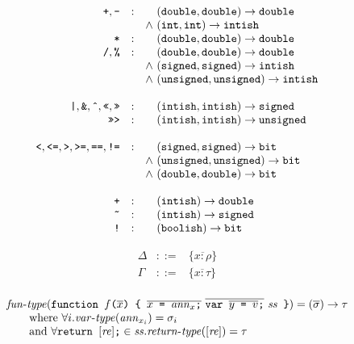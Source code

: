 \documentclass{article}
\newcommand{\funtype}{\mathit{fun}\mbox{-}\mathit{type}}
\newcommand{\vartype}{\mathit{var}\mbox{-}\mathit{type}}
\newcommand{\rettype}{\mathit{return}\mbox{-}\mathit{type}}
\newcommand{\funty}[2]{({#1}) \rightarrow {#2}}
\newcommand{\seq}[1]{\overline{{#1}}}
\newcommand{\mathjs}[1]{\mbox{\texttt{{#1}}}}
\newcommand{\return}[1]{\mathjs{return }{#1}\mathjs{;}}
\newcommand{\fun}[3]{\mathjs{function }{#1}\mathjs{(}{#2}\mathjs{) \char123{} }{#3}\mathjs{ \char125{}}}
\newcommand{\var}[1]{\mathjs{var }{#1}\mathjs{;}}
\newcommand{\bit}{\mathtt{bit}}
\newcommand{\unsigned}{\mathtt{unsigned}}
\newcommand{\signed}{\mathtt{signed}}
\newcommand{\double}{\mathtt{double}}
\renewcommand{\int}{\mathtt{int}}
\newcommand{\boolish}{\mathtt{boolish}}
\newcommand{\intish}{\mathtt{intish}}
\begin{document}
\[
\begin{array}{rcc@{\ }l}
\mathjs{+}, \mathjs{-}
                 & : &       & \funty{\double, \double}{\double} \\
                 &   & \land & \funty{\int, \int}{\intish} \\
\mathjs{*}       & : &       & \funty{\double, \double}{\double} \\
\mathjs{/}, \mathjs{\%}
                 & : &       & \funty{\double, \double}{\double} \\
                 &   & \land & \funty{\signed, \signed}{\intish}  \\
                 &   & \land & \funty{\unsigned, \unsigned}{\intish} \\
\\
\mathjs{|}, \mathjs{\&}, \mathjs{\^{}}, \mathjs{<<}, \mathjs{>>}
                 & : &       & \funty{\intish, \intish}{\signed} \\
\mathjs{>>>}     & : &       & \funty{\intish, \intish}{\unsigned} \\
\\
\mathjs{<}, \mathjs{<=}, \mathjs{>}, \mathjs{>=}, \mathjs{==}, \mathjs{!=}
                 & : &       & \funty{\signed, \signed}{\bit} \\
                 &   & \land & \funty{\unsigned, \unsigned}{\bit} \\
                 &   & \land & \funty{\double, \double}{\bit} \\
\\
\mathjs{+}       & : &       & \funty{\intish}{\double} \\
\mathjs{\~{}}    & : &       & \funty{\intish}{\signed} \\
\mathjs{!}       & : &       & \funty{\boolish}{\bit} \\
\end{array}
\]

\[
\begin{array}{rcl}
\Delta & ::= & \{ \seq{x : \rho} \} \\
\Gamma & ::= & \{ \seq{x : \tau} \} \\
\end{array}
\]

\[
\begin{array}{l}
\funtype(\fun{f}{\seq{x}}{\seq{x\mathjs{ = }\mathit{ann}_x\mathjs{;}}\ \seq{\var{\seq{y\mathjs{ = }v}}}\ \mathit{ss}}) = \funty{\seq{\sigma}}{\tau} \\
\qquad \mbox{where } \forall i . \vartype(\mathit{ann}_{x_i}) = \sigma_i \\
\qquad \mbox{and } \forall \return{[\mathit{re}]} \in \mathit{ss} . \rettype([\mathit{re}]) = \tau
\end{array}
\]
\end{document}
